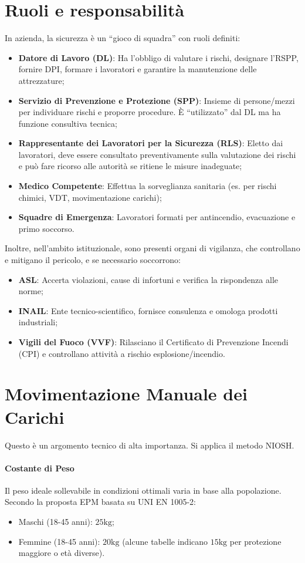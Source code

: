 %
\section{Ruoli e responsabilità}
In azienda, la sicurezza è un ``gioco di squadra'' con ruoli definiti:
\begin{itemize}
    \item \textbf{Datore di Lavoro (DL)}: Ha l'obbligo di valutare i rischi, designare l'RSPP, fornire DPI, formare i lavoratori e garantire la manutenzione delle attrezzature;
    \item \textbf{Servizio di Prevenzione e Protezione (SPP)}: Insieme di persone/mezzi per individuare rischi e proporre procedure. È ``utilizzato'' dal DL ma ha funzione consultiva tecnica;
    \item \textbf{Rappresentante dei Lavoratori per la Sicurezza (RLS)}: Eletto dai lavoratori, deve essere consultato preventivamente sulla valutazione dei rischi e può fare ricorso alle autorità se ritiene le misure inadeguate;
    \item \textbf{Medico Competente}: Effettua la sorveglianza sanitaria (es. per rischi chimici, VDT, movimentazione carichi);
    \item \textbf{Squadre di Emergenza}: Lavoratori formati per antincendio, evacuazione e primo soccorso.
\end{itemize}
Inoltre, nell'ambito istituzionale, sono presenti organi di vigilanza, che controllano e mitigano il pericolo, e se necessario soccorrono:
\begin{itemize}
    \item \textbf{ASL}: Accerta violazioni, cause di infortuni e verifica la rispondenza alle norme;
    \item \textbf{INAIL}: Ente tecnico-scientifico, fornisce consulenza e omologa prodotti industriali;
    \item \textbf{Vigili del Fuoco (VVF)}: Rilasciano il Certificato di Prevenzione Incendi (CPI) e controllano attività a rischio esplosione/incendio.
\end{itemize}

%
\section{Movimentazione Manuale dei Carichi}
Questo è un argomento tecnico di alta importanza. Si applica il metodo NIOSH.
%
\paragraph{Costante di Peso} Il peso ideale sollevabile in condizioni ottimali varia in base alla popolazione. Secondo la proposta EPM basata su UNI EN 1005-2:
\begin{itemize}
    \item Maschi (18-45 anni): $ 25 \si{\kg} $;
    \item Femmine (18-45 anni): $ 20 \si{\kg} $ (alcune tabelle indicano $ 15 \si{\kg} $ per protezione maggiore o età diverse).
\end{itemize}

